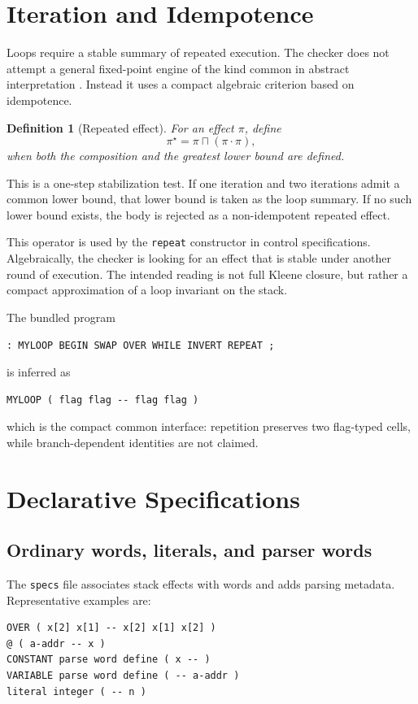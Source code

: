 \documentclass[11pt]{article}
\newtheorem{definition}{Definition}
\newcommand{\glb}{\mathbin{\sqcap}}
\newcommand{\compose}{\mathbin{\cdot}}
\begin{document}
\section{Iteration and Idempotence}
Loops require a stable summary of repeated execution. The checker does not attempt a general fixed-point engine of the kind common in abstract interpretation \cite{cousot1977abstract}. Instead it uses a compact algebraic criterion based on idempotence.

\begin{definition}[Repeated effect]
For an effect $\pi$, define
\[
\pi^\star = \pi \glb (\pi \compose \pi),
\]
when both the composition and the greatest lower bound are defined.
\end{definition}

This is a one-step stabilization test. If one iteration and two iterations admit a common lower bound, that lower bound is taken as the loop summary. If no such lower bound exists, the body is rejected as a non-idempotent repeated effect.

This operator is used by the \texttt{repeat} constructor in control specifications. Algebraically, the checker is looking for an effect that is stable under another round of execution. The intended reading is not full Kleene closure, but rather a compact approximation of a loop invariant on the stack.

The bundled program
\begin{lstlisting}
: MYLOOP BEGIN SWAP OVER WHILE INVERT REPEAT ;
\end{lstlisting}
is inferred as
\begin{lstlisting}
MYLOOP ( flag flag -- flag flag )
\end{lstlisting}
which is the compact common interface: repetition preserves two flag-typed cells, while branch-dependent identities are not claimed.

\section{Declarative Specifications}
\subsection{Ordinary words, literals, and parser words}
The \texttt{specs} file associates stack effects with words and adds parsing metadata. Representative examples are:
\begin{lstlisting}
OVER ( x[2] x[1] -- x[2] x[1] x[2] )
@ ( a-addr -- x )
CONSTANT parse word define ( x -- )
VARIABLE parse word define ( -- a-addr )
literal integer ( -- n )
\end{lstlisting}
\end{document}
